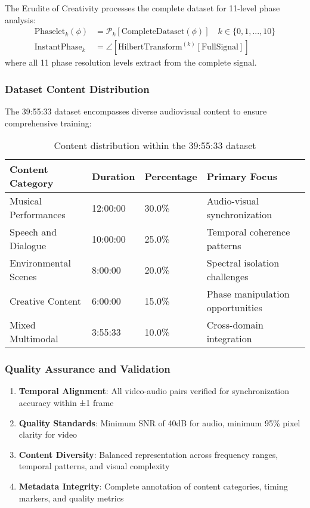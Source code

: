\begin{definition}
The Erudite of Creativity processes the complete dataset for 11-level phase analysis:
\begin{align}
\text{Phaselet}_{k}(\phi) &= \mathcal{P}_k[\text{CompleteDataset}(\phi)] \quad k \in \{0,1,...,10\} \\
\text{InstantPhase}_{k} &= \angle[\text{HilbertTransform}^{(k)}[\text{FullSignal}]]
\end{align}
where all 11 phase resolution levels extract from the complete signal.
\end{definition}

\subsubsection{Dataset Content Distribution}

The 39:55:33 dataset encompasses diverse audiovisual content to ensure comprehensive training:

\begin{table}[h]
\centering
\begin{tabular}{|l|l|l|l|}
\hline
\textbf{Content Category} & \textbf{Duration} & \textbf{Percentage} & \textbf{Primary Focus} \\
\hline
Musical Performances & 12:00:00 & 30.0\% & Audio-visual synchronization \\
\hline
Speech and Dialogue & 10:00:00 & 25.0\% & Temporal coherence patterns \\
\hline
Environmental Scenes & 8:00:00 & 20.0\% & Spectral isolation challenges \\
\hline
Creative Content & 6:00:00 & 15.0\% & Phase manipulation opportunities \\
\hline
Mixed Multimodal & 3:55:33 & 10.0\% & Cross-domain integration \\
\hline
\end{tabular}
\caption{Content distribution within the 39:55:33 dataset}
\end{table}

\subsubsection{Quality Assurance and Validation}

\begin{enumerate}
    \item \textbf{Temporal Alignment}: All video-audio pairs verified for synchronization accuracy within ±1 frame
    \item \textbf{Quality Standards}: Minimum SNR of 40dB for audio, minimum 95\% pixel clarity for video
    \item \textbf{Content Diversity}: Balanced representation across frequency ranges, temporal patterns, and visual complexity
    \item \textbf{Metadata Integrity}: Complete annotation of content categories, timing markers, and quality metrics
\end{enumerate}

